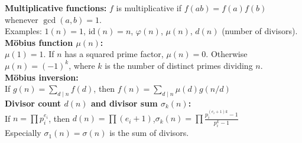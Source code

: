 \textbf{Multiplicative functions:} $f$ is multiplicative if $f(ab)=f(a)f(b)$ whenever $\gcd(a,b)=1$. \\[1mm]
Examples: $1(n)=1$, $\mathrm{id}(n)=n$, $\varphi(n)$, $\mu(n)$, $d(n)$ (number of divisors). \\

\textbf{Möbius function $\mu(n)$:} \\[1mm]
$\mu(1)=1$. If $n$ has a squared prime factor, $\mu(n)=0$. Otherwise $\mu(n)=(-1)^k$, where $k$ is the number of distinct primes dividing $n$. \\

\textbf{Möbius inversion:} \\[1mm]
If $g(n)=\sum_{d\mid n} f(d)$, then $f(n)=\sum_{d\mid n} \mu(d) g(n/d)$ \\

\textbf{Divisor count $d(n)$ and divisor sum $\sigma_k(n)$:} \\[1mm]
If $n=\prod p_i^{e_i}$, then
$d(n)=\prod (e_i+1)$,\quad $\sigma_k(n)=\prod \frac{p_i^{(e_i+1)k}-1}{p_i^k-1}$ \\
Especially $\sigma_1(n)=\sigma(n)$ is the sum of divisors. \\
